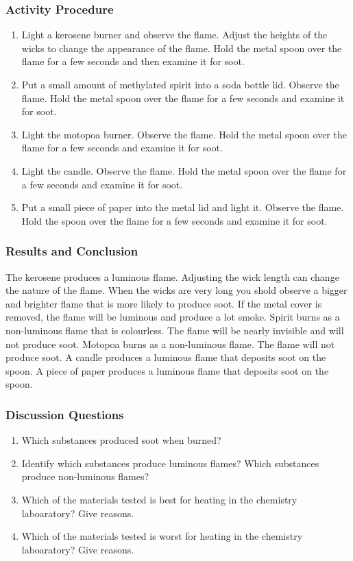 \subsubsection*{Activity Procedure}
\begin{enumerate}
\item{Light a kerosene burner and observe the flame. Adjust the heights of the wicks to change the appearance of the flame. Hold the metal spoon over the flame for a few seconds and then examine it for soot.}
\item{Put a small amount of methylated spirit into a soda bottle lid. Observe the flame. Hold the metal spoon over the flame for a few seconds and examine it for soot.}
\item{Light the motopoa burner. Observe the flame. Hold the metal spoon over the flame for a few seconds and examine it for soot.}
\item{Light the candle. Observe the flame. Hold the metal spoon over the flame for a few seconds and examine it for soot.}
\item{Put a small piece of paper into the metal lid and light it. Observe the flame. Hold the spoon over the flame for a few seconds and examine it for soot.}
\end{enumerate}

\subsubsection*{Results and Conclusion}
The kerosene produces a luminous flame. Adjusting the wick length can change the nature of the flame. When the wicks are very long you shold observe a bigger and brighter flame that is more likely to produce soot. If the metal cover is removed, the flame will be luminous and produce a lot smoke.
Spirit burns as a non-luminous flame that is colourless. The flame will be nearly invisible and will not produce soot.
Motopoa burns as a non-luminous flame. The flame will not produce soot.
A candle produces a luminous flame that deposits soot on the spoon.
A piece of paper produces a luminous flame that deposits soot on the spoon.
\subsubsection*{Discussion Questions}
\begin{enumerate}
\item{Which substances produced soot when burned?}
\item{Identify which substances produce luminous flames? Which substances produce non-luminous flames?}
\item{Which of the materials tested is best for heating in the chemistry laboaratory? Give reasons.}
\item{Which of the materials tested is worst for heating in the chemistry laboaratory? Give reasons.}
\end{enumerate}

